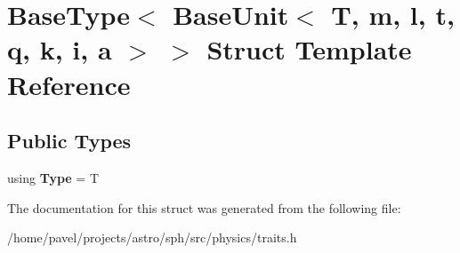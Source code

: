 \hypertarget{structBaseType_3_01BaseUnit_3_01T_00_01m_00_01l_00_01t_00_01q_00_01k_00_01i_00_01a_01_4_01_4}{}\section{Base\+Type$<$ Base\+Unit$<$ T, m, l, t, q, k, i, a $>$ $>$ Struct Template Reference}
\label{structBaseType_3_01BaseUnit_3_01T_00_01m_00_01l_00_01t_00_01q_00_01k_00_01i_00_01a_01_4_01_4}
\subsection*{Public Types}
\begin{DoxyCompactItemize}
\item 
\hypertarget{structBaseType_3_01BaseUnit_3_01T_00_01m_00_01l_00_01t_00_01q_00_01k_00_01i_00_01a_01_4_01_4_a86566ae5d02993ed09996dae00befd59}{}\label{structBaseType_3_01BaseUnit_3_01T_00_01m_00_01l_00_01t_00_01q_00_01k_00_01i_00_01a_01_4_01_4_a86566ae5d02993ed09996dae00befd59} 
using {\bfseries Type} = T
\end{DoxyCompactItemize}


The documentation for this struct was generated from the following file\+:\begin{DoxyCompactItemize}
\item 
/home/pavel/projects/astro/sph/src/physics/traits.\+h\end{DoxyCompactItemize}
